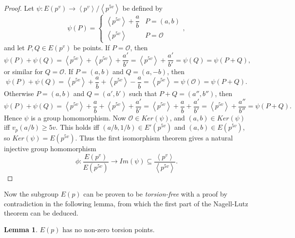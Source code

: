 \documentclass{article}
\newcommand{\rb}[1]{\left( #1 \right)}
\newcommand{\ab}[1]{\left\langle #1 \right\rangle}
\theoremstyle{definition}\newtheorem*{definition}{Definition}
\theoremstyle{definition}\newtheorem*{example}{Example}
\theoremstyle{definition}\newtheorem*{remark}{Remark}
\newtheorem{lemma}[proposition]{Lemma}
\begin{document}
\begin{proof}
Let $ \psi : E\rb{p^v} \to \ab{p^v} / \ab{p^{5v}} $ be defined by
$$ \psi\rb{P} = \begin{cases} \ab{p^{5v}} + \dfrac{a}{b} & P = \rb{a, b} \\ \ab{p^{5v}} & P = \mathcal{O} \end{cases}, $$
and let $ P, Q \in E\rb{p^v} $ be points. If $ P = \mathcal{O} $, then
$$ \psi\rb{P} + \psi\rb{Q} = \ab{p^{5v}} + \ab{p^{5v}} + \dfrac{a'}{b'} = \ab{p^{5v}} + \dfrac{a'}{b'} = \psi\rb{Q} = \psi\rb{P + Q}, $$
or similar for $ Q = \mathcal{O} $. If $ P = \rb{a, b} $ and $ Q = \rb{a, -b} $, then
$$ \psi\rb{P} + \psi\rb{Q} = \ab{p^{5v}} + \dfrac{a}{b} + \ab{p^{5v}} - \dfrac{a}{b} = \ab{p^{5v}} = \psi\rb{\mathcal{O}} = \psi\rb{P + Q}. $$
Otherwise $ P = \rb{a, b} $ and $ Q = \rb{a', b'} $ such that $ P + Q = \rb{a'', b''} $, then
$$ \psi\rb{P} + \psi\rb{Q} = \ab{p^{5v}} + \dfrac{a}{b} + \ab{p^{5v}} + \dfrac{a'}{b'} = \ab{p^{5v}} + \dfrac{a}{b} + \dfrac{a'}{b'} = \ab{p^{5v}} + \dfrac{a''}{b''} = \psi\rb{P + Q}. $$
Hence $ \psi $ is a group homomorphism. Now $ \mathcal{O} \in Ker\rb{\psi} $, and $ \rb{a, b} \in Ker\rb{\psi} $ iff $ v_p\rb{a / b} \ge 5v $. This holds iff $ \rb{a / b, 1 / b} \in E'\rb{p^{5v}} $ and $ \rb{a, b} \in E\rb{p^{5v}} $, so $ Ker\rb{\psi} = E\rb{p^{5v}} $. Thus the first isomorphism theorem gives a natural injective group homomorphism
$$ \phi : \dfrac{E\rb{p^v}}{E\rb{p^{5v}}} \to Im\rb{\psi} \subseteq \dfrac{\ab{p^v}}{\ab{p^{5v}}}. $$
\end{proof}

Now the subgroup $ E\rb{p} $ can be proven to be \emph{torsion-free} with a proof by contradiction in the following lemma, from which the first part of the Nagell-Lutz theorem can be deduced.

\begin{lemma}
$ E\rb{p} $ has no non-zero torsion points.
\end{lemma}
\end{document}
